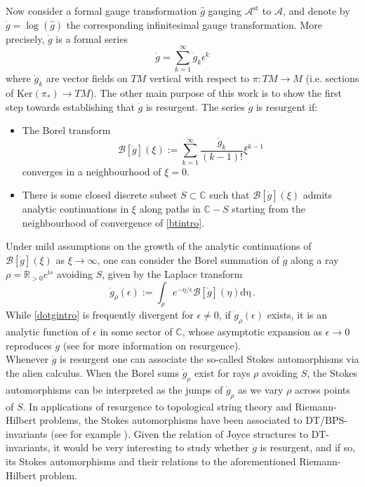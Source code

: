 \documentclass{article}
\theoremstyle{definition}
\numberwithin{equation}{section}
\begin{document}
Now consider a formal gauge transformation $\hat{g}$ gauging $\mathcal{A}^{\text{st}}$ to $\mathcal{A}$, and denote by $\dot{g}=\log(\widehat{g})$ the corresponding infinitesimal gauge transformation. More precisely, $\dot{g}$ is a formal series
\begin{equation}\label{dotgintro}
    \dot{g}=\sum_{k=1}^{\infty}\dot{g}_k\epsilon^k
\end{equation}
where $\dot{g}_k$ are vector fields on $TM$ vertical with respect to $\pi:TM\to M$ (i.e. sections of $\text{Ker}(\pi_*)\to TM$). The other main purpose of this work is to show the first step towards establishing that $\dot{g}$ is resurgent. The series $\dot{g}$ is resurgent if:
\begin{itemize}
    \item The Borel transform
\begin{equation}\label{btintro}
    \mathcal{B}[\dot{g}](\xi):=\sum_{k=1}^{\infty}\frac{\dot{g}_k}{(k-1)!}\xi^{k-1}
\end{equation}
converges in a neighbourhood of $\xi=0$.
\item There is some closed discrete subset $S\subset \mathbb{C}$ such that $\mathcal{B}[\dot{g}](\xi)$ admits analytic continuations in $\xi$ along paths in $\mathbb{C}-S$ starting from the neighbourhood of convergence of \eqref{btintro}.
\end{itemize} Under mild assumptions on the growth of the analytic continuations of $\mathcal{B}[\dot{g}](\xi)$ as $\xi\to \infty$, one can consider the Borel summation of $\dot{g}$ along a ray $\rho=\mathbb{R}_{>0}e^{\mathrm{i}s}$ avoiding $S$, given by the Laplace transform
\begin{equation}\label{BorelSum}
    \dot{g}_{\rho}(\epsilon):=\int_{\rho}e^{-\eta/\epsilon}\mathcal{B}[\dot{g}](\eta)\mathrm{d\eta}\,.
\end{equation}
While \eqref{dotgintro} is frequently divergent for $\epsilon \neq 0$, if $\dot{g}_{\rho}(\epsilon)$ exists, it is an analytic function of $\epsilon$ in some sector of $\mathbb{C}$, whose asymptotic expansion as $\epsilon \to 0$ reproduces $\dot{g}$ (see \cite{MitschiSauzin2016DSSR1} for more information on resurgence). \\

Whenever $\dot{g}$ is resurgent one can associate the so-called Stokes automorphisms via the alien calculus. When the Borel sums $\dot{g}_{\rho}$ exist for rays $\rho$ avoiding $S$, the Stokes automorphisms can be interpreted as the jumps of $\dot{g}_{\rho}$ as we vary $\rho$ across points of $S$. In applications of resurgence to topological string theory and Riemann-Hilbert problems, the Stokes automorphisms have been associated to DT/BPS-invariants (see for example \cite{GPKM,AMM,  ASTT,BriTul}). Given the relation of Joyce structures to DT-invariants, it would be very interesting to study whether $\dot{g}$ is resurgent, and if so, its Stokes automorphisms and their relations to the aforementioned Riemann-Hilbert problem. \\
\end{document}
